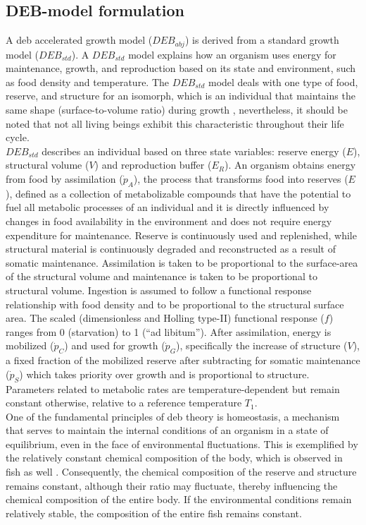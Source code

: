 \subsection{DEB-model formulation}\label{Chap4MethDEBformulation}

A \acrshort{deb} accelerated growth model ($DEB_{abj}$) is derived from a standard growth model ($DEB_{std}$). A $DEB_{std}$ model explains how an organism uses energy for maintenance, growth, and reproduction based on its state and environment, such as food density and temperature. The $DEB_{std}$ model deals with one type of food, reserve, and structure for an isomorph, which is an individual that maintains the same shape (surface-to-volume ratio) during growth \citep{Kooi2009}, nevertheless, it should be noted that not all living beings exhibit this characteristic throughout their life cycle.\\

$DEB_{std}$ describes an individual based on three state variables: reserve energy ($E$), structural volume ($V$) and reproduction buffer ($E_{R}$). An organism obtains energy from food by assimilation ($\dot{p}_{A}$), the process that transforms food into reserves ($E$), defined as a collection of metabolizable compounds that have the potential to fuel all metabolic processes of an individual and it is directly influenced by changes in food availability in the environment and does not require energy expenditure for maintenance. Reserve is continuously used and replenished, while structural material is continuously degraded and reconstructed as a result of somatic maintenance. Assimilation is taken to be proportional to the surface-area of the structural volume and maintenance is taken to be proportional to structural volume. Ingestion is assumed to follow a functional response relationship with food density and to be proportional to the structural surface area. The scaled (dimensionless and Holling type-II) functional response ($f$) ranges from 0 (starvation) to 1 (``ad libitum''). After assimilation, energy is mobilized ($\dot{p}_{C}$) and used for growth ($\dot{p}_{G}$), specifically the increase of structure ($V$), a fixed fraction of the mobilized reserve after subtracting for somatic maintenance ($\dot{p}_{S}$) which takes priority over growth and is proportional to structure. Parameters related to metabolic rates are temperature-dependent but remain constant otherwise, relative to a reference temperature $T_{1}$.\\

One of the fundamental principles of \acrshort{deb} theory is homeostasis, a mechanism that serves to maintain the internal conditions of an organism in a state of equilibrium, even in the face of environmental fluctuations. This is exemplified by the relatively constant chemical composition of the body, which is observed in fish as well \citep{Kooi2009}. Consequently, the chemical composition of the reserve and structure remains constant, although their ratio may fluctuate, thereby influencing the chemical composition of the entire body. If the environmental conditions remain relatively stable, the composition of the entire fish remains constant.\\

